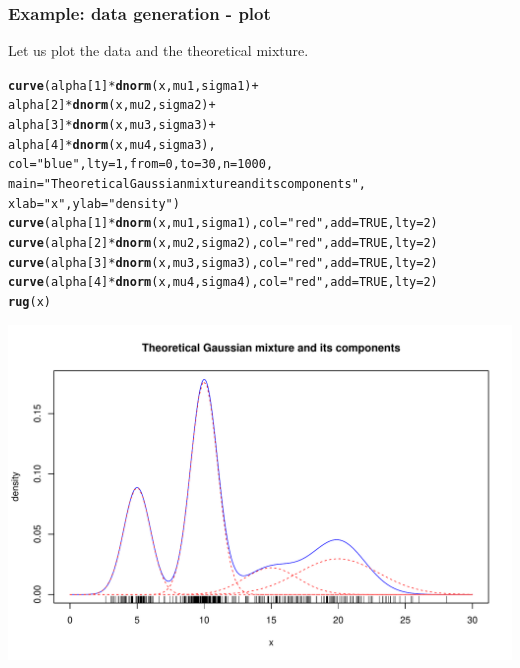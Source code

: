 \documentclass{beamer}\usepackage[]{graphicx}\usepackage[]{color}
\makeatletter
\newcommand{\hlnum}[1]{\textcolor[rgb]{0.686,0.059,0.569}{#1}}%
\newcommand{\hlstr}[1]{\textcolor[rgb]{0.192,0.494,0.8}{#1}}%
\newcommand{\hlopt}[1]{\textcolor[rgb]{0,0,0}{#1}}%
\newcommand{\hlstd}[1]{\textcolor[rgb]{0.345,0.345,0.345}{#1}}%
\newcommand{\hlkwc}[1]{\textcolor[rgb]{0.333,0.667,0.333}{#1}}%
\newcommand{\hlkwd}[1]{\textcolor[rgb]{0.737,0.353,0.396}{\textbf{#1}}}%
\newenvironment{kframe}{%
 \def\at@end@of@kframe{}%
 \ifinner\ifhmode%
  \def\at@end@of@kframe{\end{minipage}}%
  \begin{minipage}{\columnwidth}%
 \fi\fi%
 \def\FrameCommand##1{\hskip\@totalleftmargin \hskip-\fboxsep
 \colorbox{shadecolor}{##1}\hskip-\fboxsep
     \hskip-\linewidth \hskip-\@totalleftmargin \hskip\columnwidth}%
 \MakeFramed {\advance\hsize-\width
   \@totalleftmargin\z@ \linewidth\hsize
   \@setminipage}}%
 {\par\unskip\endMakeFramed%
 \at@end@of@kframe}
\newenvironment{knitrout}{}{} %
\makeatother
\begin{document}
\begin{frame}
  \frametitle{Example: data generation - plot}

Let us plot the data and the theoretical mixture.
\begin{knitrout}\scriptsize
{}\color{fgcolor}\begin{kframe}
\begin{alltt}
\hlkwd{curve}\hlstd{(alpha[}\hlnum{1}\hlstd{]}\hlopt{*}\hlkwd{dnorm}\hlstd{(x,mu1,sigma1)} \hlopt{+}
      \hlstd{alpha[}\hlnum{2}\hlstd{]}\hlopt{*}\hlkwd{dnorm}\hlstd{(x,mu2,sigma2)} \hlopt{+}
      \hlstd{alpha[}\hlnum{3}\hlstd{]}\hlopt{*}\hlkwd{dnorm}\hlstd{(x,mu3,sigma3)} \hlopt{+}
      \hlstd{alpha[}\hlnum{4}\hlstd{]}\hlopt{*}\hlkwd{dnorm}\hlstd{(x,mu4,sigma3),}
      \hlkwc{col}\hlstd{=}\hlstr{"blue"}\hlstd{,} \hlkwc{lty}\hlstd{=}\hlnum{1}\hlstd{,} \hlkwc{from}\hlstd{=}\hlnum{0}\hlstd{,}\hlkwc{to}\hlstd{=}\hlnum{30}\hlstd{,} \hlkwc{n}\hlstd{=}\hlnum{1000}\hlstd{,}
      \hlkwc{main}\hlstd{=}\hlstr{"Theoretical Gaussian mixture and its components"}\hlstd{,}
      \hlkwc{xlab}\hlstd{=}\hlstr{"x"}\hlstd{,} \hlkwc{ylab}\hlstd{=}\hlstr{"density"}\hlstd{)}
\hlkwd{curve}\hlstd{(alpha[}\hlnum{1}\hlstd{]}\hlopt{*}\hlkwd{dnorm}\hlstd{(x,mu1,sigma1),} \hlkwc{col}\hlstd{=}\hlstr{"red"}\hlstd{,} \hlkwc{add}\hlstd{=}\hlnum{TRUE}\hlstd{,} \hlkwc{lty}\hlstd{=}\hlnum{2}\hlstd{)}
\hlkwd{curve}\hlstd{(alpha[}\hlnum{2}\hlstd{]}\hlopt{*}\hlkwd{dnorm}\hlstd{(x,mu2,sigma2),} \hlkwc{col}\hlstd{=}\hlstr{"red"}\hlstd{,} \hlkwc{add}\hlstd{=}\hlnum{TRUE}\hlstd{,} \hlkwc{lty}\hlstd{=}\hlnum{2}\hlstd{)}
\hlkwd{curve}\hlstd{(alpha[}\hlnum{3}\hlstd{]}\hlopt{*}\hlkwd{dnorm}\hlstd{(x,mu3,sigma3),} \hlkwc{col}\hlstd{=}\hlstr{"red"}\hlstd{,} \hlkwc{add}\hlstd{=}\hlnum{TRUE}\hlstd{,} \hlkwc{lty}\hlstd{=}\hlnum{2}\hlstd{)}
\hlkwd{curve}\hlstd{(alpha[}\hlnum{4}\hlstd{]}\hlopt{*}\hlkwd{dnorm}\hlstd{(x,mu4,sigma4),} \hlkwc{col}\hlstd{=}\hlstr{"red"}\hlstd{,} \hlkwc{add}\hlstd{=}\hlnum{TRUE}\hlstd{,} \hlkwc{lty}\hlstd{=}\hlnum{2}\hlstd{)}
\hlkwd{rug}\hlstd{(x)}
\end{alltt}
\end{kframe}
\includegraphics[width=.8\textwidth]{figures/EM_mixture_example_data_plot-1} 

\end{knitrout}
\end{frame}
\end{document}
